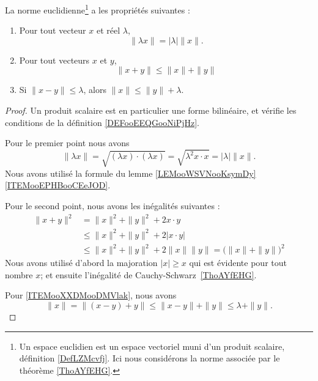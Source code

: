 \begin{proposition}     \label{PROPooVSVMooZrqxdc}
	La norme euclidienne\footnote{Un espace euclidien est un espace vectoriel muni d'un produit scalaire, définition \ref{DefLZMcvfj}. Ici nous considérons la norme associée par le théorème \ref{ThoAYfEHG}.} a les propriétés suivantes :
	\begin{enumerate}
		\item
		      Pour tout vecteur \( x\) et réel \( \lambda\),
		      \begin{equation}
			      \| \lambda x \|=| \lambda |\| x \|.
		      \end{equation}
		\item
		      Pour tout vecteurs \( x\) et \( y\),
		      \begin{equation}
			      \| x+y \|\leq \| x \|+\| y \|
		      \end{equation}
		\item		\label{ITEMooXXDMooDMVlak}
		      Si \( \| x-y \|\leq \lambda\), alors \( \| x \|\leq \|y \|+\lambda\).
	\end{enumerate}
\end{proposition}

\begin{proof}
	Un produit scalaire est en particulier une forme bilinéaire, et vérifie les conditions de la définition \ref{DEFooEEQGooNiPjHz}.

	Pour le premier point nous avons
	\begin{equation}
		\| \lambda x\|=\sqrt{ (\lambda x)\cdot (\lambda x) }=\sqrt{ \lambda^2 x\cdot x }=| \lambda |\| x \|.
	\end{equation}
	Nous avons utilisé la formule du lemme \ref{LEMooWSVNooKsymDy}\ref{ITEMooEPHBooCEeJOD}.

	Pour le second point, nous avons les inégalités suivantes :
	\begin{subequations}
		\begin{align}
			\| x+y \|^2 & =\| x \|^2+\| y \|^2+2x\cdot y                                         \\
			            & \leq\| x \|^2+\| y \|^2+2|x\cdot y|                                    \\
			            & \leq\| x \|^2+\| y \|^2+2\| x \|\| y \| =\big( \| x \|+\| y \| \big)^2
		\end{align}
	\end{subequations}
	Nous avons utilisé d'abord la majoration \( | x |\geq x\) qui est évidente pour tout nombre \( x\); et ensuite l'inégalité de Cauchy-Schwarz~\ref{ThoAYfEHG}.

	Pour \ref{ITEMooXXDMooDMVlak}, nous avons
	\begin{equation}
		\| x \|=\| (x-y)+y \|\leq\| x-y \|+\| y \|\leq \lambda+\| y \|.
	\end{equation}
\end{proof}

